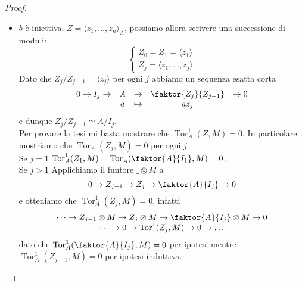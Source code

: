 \documentclass[a4paper,11pt,oneside]{book}
\DeclareMathOperator{\Tor}{Tor}
\theoremstyle{definition}
\begin{document}
\begin{proof}
\begin{itemize}
	\item $b$ è iniettiva. $Z=\langle z_1,\dots , z_n\rangle_A$, possiamo allora scrivere una successione di moduli:
		\[\begin{cases}
		   Z_0=Z_1= \langle z_1\rangle\\
		   Z_j=\langle z_1,\dots , z_j\rangle
		  \end{cases}\]
	Dato che $Z_j/Z_{j-1}=\langle z_j\rangle $ per ogni $j$ abbiamo un sequenza esatta corta
		\[\begin{matrix}
		 0\rightarrow I_j \rightarrow & A &\rightarrow & \faktor {Z_j} {Z_{j-1}} &\rightarrow 0\\
					       & a &\mapsto & az_j
		 \end{matrix}
		\]
	e dunque $Z_j/Z_{j-1}\simeq A/I_j$.\\
	Per provare la tesi mi basta mostrare che $\Tor_A^1(Z,M)=0$. In particolare mostriamo che $\Tor_A^1(Z_j,M)=0$ per ogni $j$.\\
	Se $j=1$ $\Tor_A^1(Z_1,M)=\Tor_A^1 (\faktor{A}{I_1}, M )=0$.\\
	Se $j>1$ Applichiamo il funtore $\_ \otimes M$ a 
		\[
		 0\rightarrow Z_{j-1} \rightarrow  Z_j \rightarrow  \faktor {A} {I_{j}} \rightarrow 0
		\]
	e otteniamo che  $\Tor_A^1 (Z_{j}, M )=0$, infatti
	\begin{equation*}
	\begin{matrix}
	\dots \rightarrow  Z_{j-1} \otimes M \rightarrow Z_j \otimes M \rightarrow \faktor {A} {I_{j}} \otimes M \rightarrow 0\\
	\dots\rightarrow 0 \rightarrow \Tor^1(Z_j,M) \rightarrow 0 \rightarrow  \dots
	\end{matrix}
      \end{equation*}
	dato che $\Tor_A^1 (\faktor{A}{I_j}, M )=0$ per ipotesi mentre $\Tor_A^1 (Z_{j-1}, M )=0$ per ipotesi induttiva.\\
     \end{itemize}   
   \end{proof}
  
\end{document}
